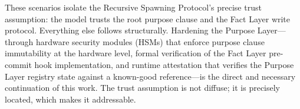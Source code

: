 These scenarios isolate the Recursive Spawning Protocol's precise trust assumption: the model trusts the root purpose clause and the Fact Layer write protocol. Everything else follows structurally. Hardening the Purpose Layer---through hardware security modules (HSMs) that enforce purpose clause immutability at the hardware level, formal verification of the Fact Layer pre-commit hook implementation, and runtime attestation that verifies the Purpose Layer registry state against a known-good reference---is the direct and necessary continuation of this work. The trust assumption is not diffuse; it is precisely located, which makes it addressable.
